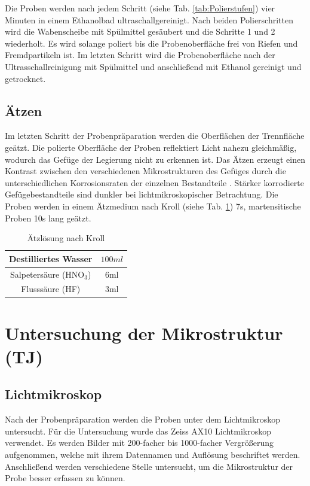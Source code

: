 Die Proben werden nach jedem Schritt (siehe Tab. \ref{tab:Polierstufen}) vier Minuten in einem Ethanolbad ultraschallgereinigt. Nach beiden Polierschritten wird die Wabenscheibe mit Spülmittel gesäubert und die Schritte 1 und 2 wiederholt. Es wird solange poliert bis die Probenoberfläche frei von Riefen und Fremdpartikeln ist. Im letzten Schritt wird die Probenoberfläche nach der Ultrasschallreinigung mit Spülmittel und anschließend mit Ethanol gereinigt und getrocknet. 



\subsection*{Ätzen}

Im letzten Schritt der Probenpräparation werden die Oberflächen der Trennfläche geätzt. Die polierte Oberfläche der Proben reflektiert Licht nahezu gleichmäßig, wodurch das Gefüge der Legierung nicht zu erkennen ist. Das Ätzen erzeugt einen Kontrast zwischen den verschiedenen Mikrostrukturen des Gefüges durch die unterschiedlichen Korrosionsraten der einzelnen Bestandteile \cite{Lutjering.2007}. Stärker korrodierte Gefügebestandteile sind dunkler bei lichtmikroskopischer Betrachtung.
Die Proben werden in einem Ätzmedium nach Kroll (siehe Tab. \ref{tab:Ätz_Kroll}) 7s, martensitische Proben 10s lang geätzt. 

\begin{table}
	\centering
	\begin{tabular}{|c|c|}
		
		\hline 
		Destilliertes Wasser
		& $100ml$
		\\ 
		\hline 
		Salpetersäure (HNO$_{3}$)	& 6ml
		\\ 
		\hline 
		Flusssäure (HF) & 3ml
		\\ 
		\hline 
	\end{tabular} 
	\caption{Ätzlösung nach Kroll}
	\label{tab:Ätz_Kroll}
\end{table}

\section{Untersuchung der Mikrostruktur (TJ)}

\subsection*{Lichtmikroskop}

Nach der Probenpräparation werden die Proben unter dem Lichtmikroskop untersucht. Für die Untersuchung wurde das Zeiss AX10 Lichtmikroskop verwendet. Es werden Bilder mit 200-facher bis 1000-facher Vergrößerung aufgenommen, welche mit ihrem Datennamen und Auflösung beschriftet werden. Anschließend werden verschiedene Stelle untersucht, um die Mikrostruktur der Probe besser erfassen zu können.

